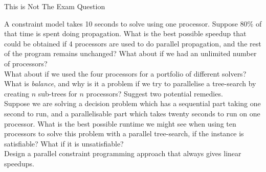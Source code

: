 \documentclass[aspectratio=169,compress,10pt]{beamer}
\begin{document}
\begin{frame}{This is Not The Exam Question}

    \scriptsize

    A constraint model takes 10 seconds to solve using one processor. Suppose 80\% of that time is
    spent doing propagation. What is the best possible speedup that could be obtained if 4
    processors are used to do parallel propagation, and the rest of the program remains
    unchanged? What about if we had an unlimited number of processors?
    \\[0.5cm]

    What about if we used the four processors for a portfolio of different solvers? \\[0.5cm]

    What is \emph{balance}, and why is it a problem if we try to parallelise a tree-search by
    creating $n$ sub-trees for $n$ processors? Suggest two potential remedies. \\[0.5cm]

    Suppose we are solving a decision problem which has a sequential part taking
    one second to run, and a parallelisable part which takes twenty seconds to run on one
    processor. What is the best possible runtime we might see when using ten processors to
    solve this problem with a parallel tree-search, if the instance is satisfiable? What if
    it is unsatisfiable? \\[0.5cm]

    Design a parallel constraint programming approach that always gives linear speedups.

\end{frame}

\end{document}
